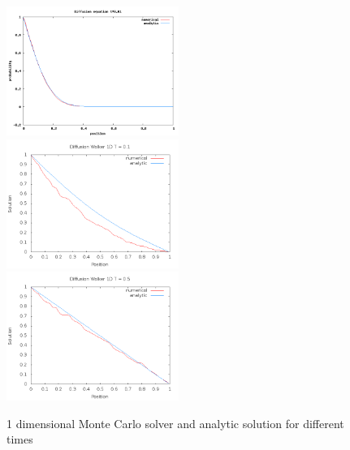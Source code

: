 \documentclass[a4wide,12pt]{article}
\begin{document}
\begin{figure}[p]
 \includegraphics[width=0.5\textwidth]{diff1d001}
 \includegraphics[width=0.5\textwidth]{diff1dt01}
 \includegraphics[width=0.5\textwidth]{diff1dt05}
 \caption{1 dimensional Monte Carlo solver and analytic solution for different times}
 \label{fig:01}
\end{figure}
\end{document}
